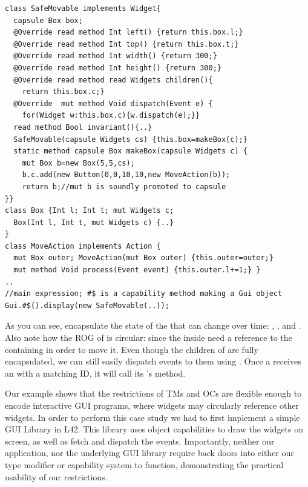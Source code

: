 \begin{lstlisting}[mathescape=false]
class SafeMovable implements Widget{
  capsule Box box;
  @Override read method Int left() {return this.box.l;}
  @Override read method Int top() {return this.box.t;}
  @Override read method Int width() {return 300;}
  @Override read method Int height() {return 300;}
  @Override read method read Widgets children(){
    return this.box.c;}
  @Override  mut method Void dispatch(Event e) {
    for(Widget w:this.box.c){w.dispatch(e);}}
  read method Bool invariant(){..}
  SafeMovable(capsule Widgets cs) {this.box=makeBox(c);}
  static method capsule Box makeBox(capsule Widgets c) {
    mut Box b=new Box(5,5,cs);
    b.c.add(new Button(0,0,10,10,new MoveAction(b));
    return b;//mut b is soundly promoted to capsule
}}
class Box {Int l; Int t; mut Widgets c;
  Box(Int l, Int t, mut Widgets c) {..}
}
class MoveAction implements Action {
  mut Box outer; MoveAction(mut Box outer) {this.outer=outer;}
  mut method Void process(Event event) {this.outer.l+=1;} }
..
//main expression; #$ is a capability method making a Gui object
Gui.#$().display(new SafeMovable(..));
\end{lstlisting}\saveSpace
As you can see, \Q@Box@es encapsulate the state of the \Q@SafeMovable@s that can change over time:
\Q@left@, \Q@top@, and \Q@children@. Also note how the ROG of \Q@Box@ is circular: since
the \Q@MoveAction@s inside \Q@Button@s need a reference to the containing \Q@Box@ in order to move it.
Even though the children of \Q@SafeMovable@s are fully encapsulated, we can still easily dispatch events to them using \Q@dispatch@. Once a \Q@Button@ receives an \Q@Event@ with a matching ID, it will call its \Q@Action@'s \Q@process@ method. 

Our example shows that the restrictions of TMs and OCs are flexible enough to encode interactive GUI programs, where widgets may circularly reference other widgets.
In order to perform this case study we had to first implement a simple GUI Library in L42. This library uses object capabilities to draw the widgets on screen, as well as fetch and dispatch the events. Importantly, neither our application, nor the underlying GUI library require back doors into either our type modifier or capability system to function, demonstrating the practical usability of our restrictions.


